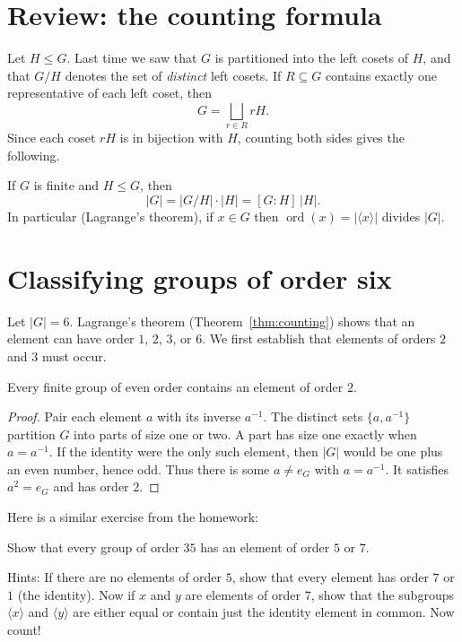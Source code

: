 \documentclass[reqno,11pt]{amsart}
\begin{document}
\makelecturetitle

\section{Review: the counting formula}

Let $H\leq G$. Last time we saw that $G$ is partitioned into the left
cosets of $H$, and that $G/H$ denotes the set of \emph{distinct} left
cosets. If $R\subseteq G$ contains exactly one representative of each
left coset, then
\[
  G=\bigsqcup_{r\in R}rH.
\]
Since each coset $rH$ is in bijection with $H$, counting both sides gives
the following.

\begin{theorem}\label{thm:counting}
If $G$ is finite and $H\leq G$, then
\begin{equation}
  |G|=|G/H|\cdot|H|=[G:H]\,|H|.
\end{equation}
In particular (Lagrange's theorem), if $x\in G$ then
$\operatorname{ord}(x)=|\langle x\rangle|$ divides $|G|$.
\end{theorem}

\section{Classifying groups of order six}

Let $|G|=6$. Lagrange's theorem (Theorem~\ref{thm:counting}) shows that an element can have order
$1$, $2$, $3$, or $6$. We first establish that elements of orders $2$ and
$3$ must occur.

\begin{lemma}
Every finite group of even order contains an element of order $2$.
\end{lemma}
\begin{proof}
Pair each element $a$ with its inverse $a^{-1}$. The distinct sets
$\{a,a^{-1}\}$ partition $G$ into parts of size one or two. A part has
size one exactly when $a=a^{-1}$.
If the identity were the only such element, then $|G|$ would be one plus
an even number, hence odd. Thus there is some $a\neq e_G$ with
$a=a^{-1}$. It satisfies $a^2=e_G$ and has order $2$.
\end{proof}

Here is a similar exercise from the homework: 

\begin{question} Show that every group of order $35$ has an element of order $5$ or $7$.

Hints: If there are no elements of order $5$, show that every element has order $7$ or $1$ (the identity). Now if $x$ and $y$ are elements of order $7$, show that the subgroups $\langle x \rangle $ and $\langle y \rangle$ are either equal or contain just the identity element in common. Now count!  
 \end{question}
\end{document}
